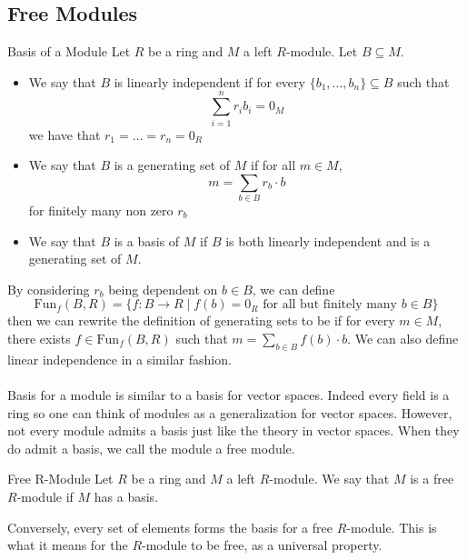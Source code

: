 \documentclass[a4paper]{article}
\begin{document}
\subsection{Free Modules}
\begin{defn}{Basis of a Module}{} Let $R$ be a ring and $M$ a left $R$-module. Let $B\subseteq M$. 
\begin{itemize}
\item We say that $B$ is linearly independent if for every $\{b_1,\dots,b_n\}\subseteq B$ such that $$\sum_{i=1}^nr_ib_i=0_M$$ we have that $r_1=\dots=r_n=0_R$
\item We say that $B$ is a generating set of $M$ if for all $m\in M$, $$m=\sum_{b\in B}r_b\cdot b$$ for finitely many non zero $r_b$
\item We say that $B$ is a basis of $M$ if $B$ is both linearly independent and is a generating set of $M$. 
\end{itemize}
\end{defn}

By considering $r_b$ being dependent on $b\in B$, we can define $$\text{Fun}_f(B,R)=\{f:B\to R\;|\;f(b)=0_R\text{ for all but finitely many }b\in B\}$$ then we can rewrite the definition of generating sets to be if for every $m\in M$, there exists $f\in\text{Fun}_f(B,R)$ such that $m=\sum_{b\in B}f(b)\cdot b$. We can also define linear independence in a similar fashion. \\~\\

Basis for a module is similar to a basis for vector spaces. Indeed every field is a ring so one can think of modules as a generalization for vector spaces. However, not every module admits a basis just like the theory in vector spaces. When they do admit a basis, we call the module a free module. 

\begin{defn}{Free R-Module}{} Let $R$ be a ring and $M$ a left $R$-module. We say that $M$ is a free $R$-module if $M$ has a basis. 
\end{defn}

Conversely, every set of elements forms the basis for a free $R$-module. This is what it means for the $R$-module to be free, as a universal property. 
\end{document}
